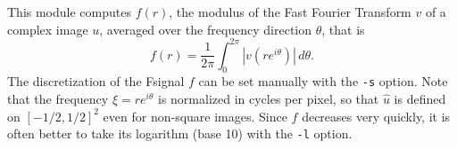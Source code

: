 This module computes $f(r)$, the modulus of the Fast Fourier Transform $v$
of a complex image $u$, averaged over the frequency direction $\theta$, that 
is
$$f(r) = \frac 1{2\pi}\int_0^{2\pi} |v(r e^{i\theta})|\,d\theta.$$
The discretization of the Fsignal $f$ can be set manually
with the \verb+-s+ option.
Note that the frequency $\xi=r e^{i\theta}$ 
is normalized in cycles per pixel, so that
$\hat u$ is defined on $[-1/2,1/2]^2$ even for non-square images.
Since $f$ decreases very quickly, it is often better to take
its logarithm (base 10) with the \verb+-l+ option.


